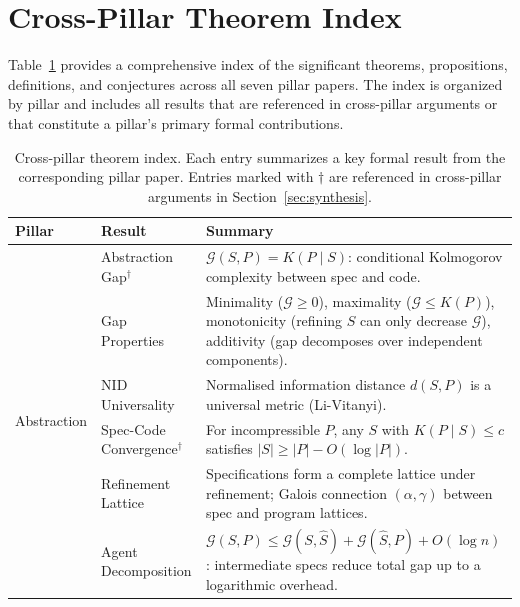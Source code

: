 \section{Cross-Pillar Theorem Index}
\label{app:theorems}

Table~\ref{tab:theorem-index} provides a comprehensive index of the significant theorems, propositions, definitions, and conjectures across all seven pillar papers. The index is organized by pillar and includes all results that are referenced in cross-pillar arguments or that constitute a pillar's primary formal contributions.

\begin{table}[H]
\centering
\caption{Cross-pillar theorem index. Each entry summarizes a key formal result from the corresponding pillar paper. Entries marked with $\dagger$ are referenced in cross-pillar arguments in Section~\ref{sec:synthesis}.}
\label{tab:theorem-index}
\small
\begin{tabular}{p{1.8cm}p{3.8cm}p{7.5cm}}
\toprule
\textbf{Pillar} & \textbf{Result} & \textbf{Summary} \\
\midrule

\multirow{6}{1.8cm}{Abstraction}
    & Abstraction Gap$^\dagger$ & $\mathcal{G}(S,P) = K(P \mid S)$: conditional Kolmogorov complexity between spec and code. \\
    & Gap Properties & Minimality ($\mathcal{G} \geq 0$), maximality ($\mathcal{G} \leq K(P)$), monotonicity (refining $S$ can only decrease $\mathcal{G}$), additivity (gap decomposes over independent components). \\
    & NID Universality & Normalised information distance $d(S,P)$ is a universal metric (Li-Vitanyi). \\
    & Spec-Code Convergence$^\dagger$ & For incompressible $P$, any $S$ with $K(P \mid S) \leq c$ satisfies $|S| \geq |P| - O(\log |P|)$. \\
    & Refinement Lattice & Specifications form a complete lattice under refinement; Galois connection $(\alpha, \gamma)$ between spec and program lattices. \\
    & Agent Decomposition & $\mathcal{G}(S,P) \leq \mathcal{G}(S, \hat{S}) + \mathcal{G}(\hat{S}, P) + O(\log n)$: intermediate specs reduce total gap up to a logarithmic overhead. \\

\midrule


\end{tabular}
\end{table}

